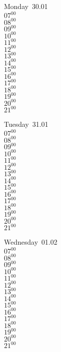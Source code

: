 \documentclass[11pt,a4paper]{book}\usepackage[]{graphicx}\usepackage[]{color}
\begin{document}
\begin{headerbox}
\end{headerbox}
\begin{weekdaybox}
  Monday~30.01\\
  { 
  \vfill
  $07^{00}$\\
$08^{00}$\\
$09^{00}$\\
$10^{00}$\\
$11^{00}$\\
$12^{00}$\\
$13^{00}$\\
$14^{00}$\\
$15^{00}$\\
$16^{00}$\\
$17^{00}$\\
$18^{00}$\\
$19^{00}$\\
$20^{00}$\\
$21^{00}$\\
  }
\end{weekdaybox}
\begin{weekdaybox}
  Tuesday~31.01\\
  { 
  \vfill
  $07^{00}$\\
$08^{00}$\\
$09^{00}$\\
$10^{00}$\\
$11^{00}$\\
$12^{00}$\\
$13^{00}$\\
$14^{00}$\\
$15^{00}$\\
$16^{00}$\\
$17^{00}$\\
$18^{00}$\\
$19^{00}$\\
$20^{00}$\\
$21^{00}$\\
  }
\end{weekdaybox}
\begin{weekdaybox}
  Wednesday~01.02\\
  { 
  \vfill
  $07^{00}$\\
$08^{00}$\\
$09^{00}$\\
$10^{00}$\\
$11^{00}$\\
$12^{00}$\\
$13^{00}$\\
$14^{00}$\\
$15^{00}$\\
$16^{00}$\\
$17^{00}$\\
$18^{00}$\\
$19^{00}$\\
$20^{00}$\\
$21^{00}$\\
  }
\end{weekdaybox}
\end{document}
